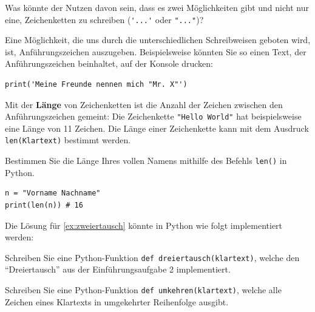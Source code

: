 \begin{mychallenge}
Was könnte der Nutzen davon sein, dass es zwei Möglichkeiten gibt und nicht nur eine, Zeichenketten zu schreiben (\lstinline|'...'| oder \lstinline|"..."|)?
\begin{myanswer}
Eine Möglichkeit, die uns durch die unterschiedlichen Schreibweisen geboten wird, ist, Anführungszeichen auszugeben. Beispielsweise könnten Sie so einen Text, der Anführungszeichen beinhaltet, auf der Konsole drucken:
\begin{lstlisting}
print('Meine Freunde nennen mich "Mr. X"')
\end{lstlisting}
\end{myanswer}
\end{mychallenge}

Mit der \textbf{Länge} von Zeichenketten ist die Anzahl der Zeichen zwischen den Anführungszeichen gemeint: Die Zeichenkette \lstinline|"Hello World"| hat beispielsweise eine Länge von 11 Zeichen. Die Länge einer Zeichenkette kann mit dem Ausdruck \lstinline|len(Klartext)| bestimmt werden.

\begin{myexercise}
	Bestimmen Sie die Länge Ihres vollen Namens mithilfe des Befehls \lstinline|len()| in Python.
\begin{lstlisting}[numbers=none]
n = "Vorname Nachname"
print(len(n)) # 16
\end{lstlisting}
\end{myexercise}

Die Lösung für \cref{ex:zweiertausch} könnte in Python wie folgt implementiert werden:


 \begin{myexercise}
 Schreiben Sie eine Python-Funktion \lstinline|def dreiertausch(klartext)|, welche den \enquote{Dreiertausch} aus der Einführungsaufgabe 2 implementiert.
 \begin{myanswer}

 \end{myanswer}
 \end{myexercise}
 
  \begin{myexercise}
  Schreiben Sie eine Python-Funktion \lstinline|def umkehren(klartext)|, welche alle Zeichen eines Klartexts in umgekehrter Reihenfolge ausgibt.
  \begin{myanswer}

  \end{myanswer}
  \end{myexercise}
  
